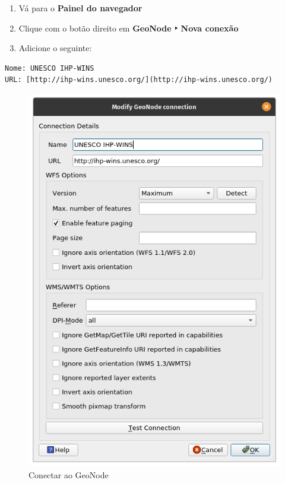 \documentclass[
]{book}
\providecommand{\tightlist}{%
  \setlength{\itemsep}{0pt}\setlength{\parskip}{0pt}}
\begin{document}
\begin{enumerate}
\def\labelenumi{\arabic{enumi}.}
\tightlist
\item
  Vá para o \textbf{Painel do navegador}
\item
  Clique com o botão direito em \textbf{GeoNode ‣ Nova conexão}
\item
  Adicione o seguinte:
\end{enumerate}

\begin{verbatim}
Nome: UNESCO IHP-WINS
URL: [http://ihp-wins.unesco.org/](http://ihp-wins.unesco.org/)
\end{verbatim}

\begin{figure}
\centering
\includegraphics{media/modulo2/connect-geonode.png}
\caption{Conectar ao GeoNode}
\end{figure}
\end{document}
